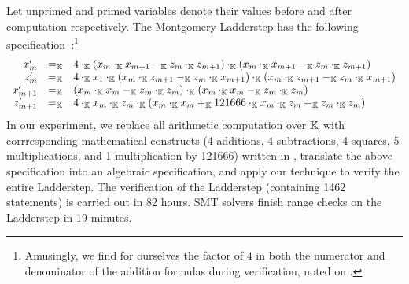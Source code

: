 Let unprimed and primed variables denote their values before and after
computation respectively.
The Montgomery Ladderstep has the following
specification~\cite{M:87:SPEC}:\footnote{Amusingly, we find for
  ourselves the factor of $4$ in both the numerator and denominator of
  the addition formulas during verification, noted on
  \cite[p.~261]{M:87:SPEC}.}
\[
\begin{array}{rcl}
  x'_{m} & =_{\mathbb{K}} & 4 \cdot_{\mathbb{K}} (x_m \cdot_{\mathbb{K}} x_{m+1} -_{\mathbb{K}} z_m \cdot_{\mathbb{K}} z_{m+1})
               \cdot_{\mathbb{K}} (x_m \cdot_{\mathbb{K}} x_{m+1} -_{\mathbb{K}} z_m \cdot_{\mathbb{K}} z_{m+1}) \\
  z'_{m} & =_{\mathbb{K}} & 4 \cdot_{\mathbb{K}} x_1 \cdot_{\mathbb{K}} (x_m \cdot_{\mathbb{K}} z_{m+1} -_{\mathbb{K}}
               z_m \cdot_{\mathbb{K}} x_{m+1})
               \cdot_{\mathbb{K}} (x_m \cdot_{\mathbb{K}} z_{m+1} -_{\mathbb{K}} z_m \cdot_{\mathbb{K}} x_{m+1}) \\
  x'_{m+1} & =_{\mathbb{K}} & (x_m \cdot_{\mathbb{K}} x_m -_{\mathbb{K}} z_m \cdot_{\mathbb{K}} z_m) \cdot_{\mathbb{K}}
                 (x_m \cdot_{\mathbb{K}} x_m -_{\mathbb{K}} z_m \cdot_{\mathbb{K}} z_m) \\
  z'_{m+1} & =_{\mathbb{K}} & 4 \cdot_{\mathbb{K}} x_m \cdot_{\mathbb{K}} z_m \cdot_{\mathbb{K}}
                 (x_m \cdot_{\mathbb{K}} x_m +_{\mathbb{K}} 121666 \cdot_{\mathbb{K}} x_m \cdot_{\mathbb{K}} z_m +_{\mathbb{K}}
                 z_m \cdot_{\mathbb{K}} z_m)
\end{array}
\]
In our experiment, we replace all arithmetic computation over $\mathbb{K}$
with corrresponding mathematical constructs (4 additions, 4 subtractions, 4 squares, 5
multiplications, and 1 multiplication by 121666) written in \mydsl,
translate the above specification into an algebraic specification, and
apply our technique to verify the entire Ladderstep.
The verification of the Ladderstep (containing 1462 statements) is carried out in 82 hours.
SMT solvers finish range checks on the Ladderstep in 19 minutes.



%
% 
%

